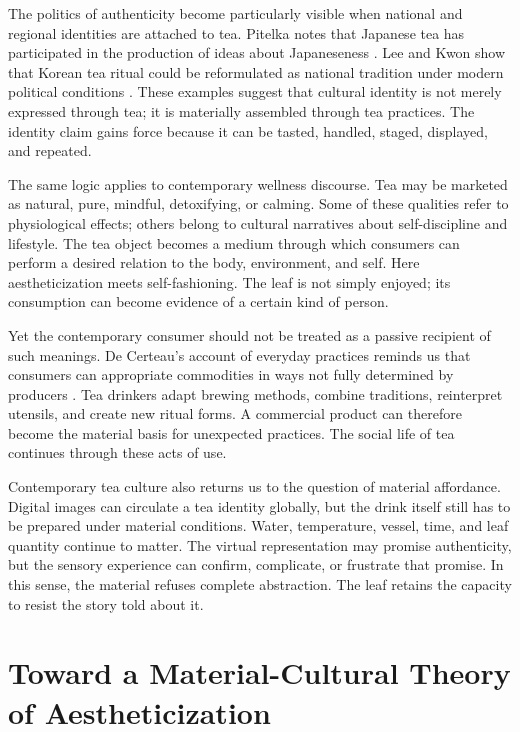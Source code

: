 \documentclass[numbers]{IntechOpen-Book}
\begin{document}
The politics of authenticity become particularly visible when national and regional identities are attached to tea. Pitelka notes that Japanese tea has participated in the production of ideas about Japaneseness \cite{pitelka2013}. Lee and Kwon show that Korean tea ritual could be reformulated as national tradition under modern political conditions \cite{leeandkwon2022}. These examples suggest that cultural identity is not merely expressed through tea; it is materially assembled through tea practices. The identity claim gains force because it can be tasted, handled, staged, displayed, and repeated.

The same logic applies to contemporary wellness discourse. Tea may be marketed as natural, pure, mindful, detoxifying, or calming. Some of these qualities refer to physiological effects; others belong to cultural narratives about self-discipline and lifestyle. The tea object becomes a medium through which consumers can perform a desired relation to the body, environment, and self. Here aestheticization meets self-fashioning. The leaf is not simply enjoyed; its consumption can become evidence of a certain kind of person.

Yet the contemporary consumer should not be treated as a passive recipient of such meanings. De Certeau's account of everyday practices reminds us that consumers can appropriate commodities in ways not fully determined by producers \cite{decerteau1984}. Tea drinkers adapt brewing methods, combine traditions, reinterpret utensils, and create new ritual forms. A commercial product can therefore become the material basis for unexpected practices. The social life of tea continues through these acts of use.

Contemporary tea culture also returns us to the question of material affordance. Digital images can circulate a tea identity globally, but the drink itself still has to be prepared under material conditions. Water, temperature, vessel, time, and leaf quantity continue to matter. The virtual representation may promise authenticity, but the sensory experience can confirm, complicate, or frustrate that promise. In this sense, the material refuses complete abstraction. The leaf retains the capacity to resist the story told about it.

\section{Toward a Material-Cultural Theory of Aestheticization}
\end{document}
